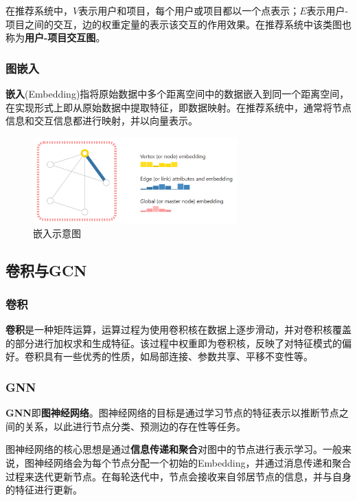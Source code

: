 \documentclass[hyperref,a4paper,UTF8]{ctexart}
\begin{document}
在推荐系统中，$V$表示用户和项目，每个用户或项目都以一个点表示；$E$表示用户-项目之间的交互，边的权重定量的表示该交互的作用效果。在推荐系统中该类图也称为\textbf{用户-项目交互图}。

\subsubsection{图嵌入}
\textbf{嵌入}(Embedding)指将原始数据中多个距离空间中的数据嵌入到同一个距离空间，在实现形式上即从原始数据中提取特征，即数据映射\cite{embeddings}。在推荐系统中，通常将节点信息和交互信息都进行映射，并以向量表示。

\begin{figure}[ht]
    \centering
    \includegraphics[width=0.7\textwidth]{fig/embedding.png}
    \caption{嵌入示意图}
    \label{fig:embedding}
\end{figure}


\subsection{卷积与GCN}

\subsubsection{卷积}
\textbf{卷积}是一种矩阵运算，运算过程为使用卷积核在数据上逐步滑动，并对卷积核覆盖的部分进行加权求和生成特征。该过程中权重即为卷积核，反映了对特征模式的偏好。卷积具有一些优秀的性质，如局部连接、参数共享、平移不变性等。

\subsubsection{GNN}
\textbf{GNN}即\textbf{图神经网络}。图神经网络的目标是通过学习节点的特征表示以推断节点之间的关系，以此进行节点分类、预测边的存在性等任务。

图神经网络的核心思想是通过\textbf{信息传递和聚合}对图中的节点进行表示学习。一般来说，图神经网络会为每个节点分配一个初始的Embedding，并通过消息传递和聚合过程来迭代更新节点。在每轮迭代中，节点会接收来自邻居节点的信息，并与自身的特征进行更新。
\end{document}
